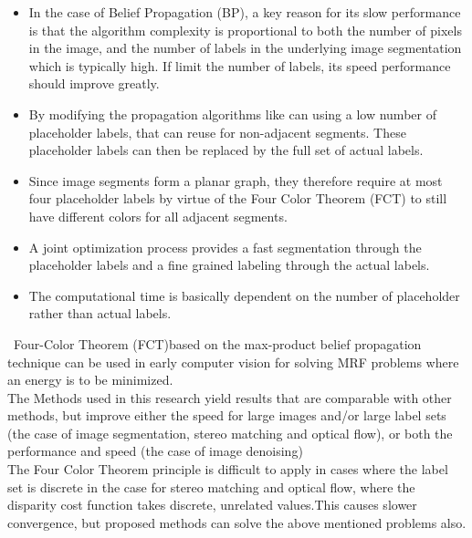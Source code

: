  \begin{itemize}
   \item In the case of Belief Propagation (BP), a key reason for its slow performance is that the algorithm complexity is proportional to both the number
of pixels in the image, and the number of labels in the underlying image segmentation
which is typically high. If  limit the number of labels, its speed performance should improve greatly.
   \item
By modifying the propagation algorithms like can using a low number of placeholder
labels, that can reuse for non-adjacent segments. These placeholder labels
can then be replaced by the full set of actual labels.
   \item Since image segments
form a planar graph, they therefore require at most four placeholder labels by
virtue of the Four Color Theorem (FCT)  to still have different colors for
all adjacent segments.
 \item A joint optimization process provides a fast segmentation
through the placeholder labels and a fine grained labeling through the
actual labels.
 \item  The computational time is basically dependent on the number
of placeholder rather than actual labels.
 \end{itemize}

\ Four-Color Theorem (FCT)based on the max-product
belief propagation technique can be used in early computer vision for solving
MRF problems where an energy is to be minimized.
\\The  Methods used in this research yield results that are comparable with other methods, but improve either the
speed for large images and/or large label sets (the case of image segmentation,
stereo matching and optical flow), or both the performance and speed (the
case of image denoising)
\\The Four Color Theorem principle is difficult to apply in cases where
the label set is discrete in the case for stereo matching and optical flow, where the
disparity cost function takes discrete, unrelated values.This causes slower
convergence, but proposed methods can solve  the above mentioned problems also.

